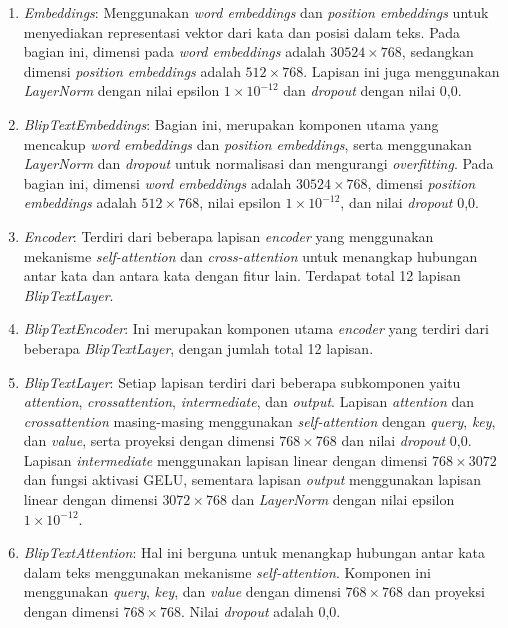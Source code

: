 \begin{enumerate}

  \item \textit{Embeddings}: Menggunakan \textit{word embeddings} dan \textit{position embeddings} untuk menyediakan representasi vektor dari kata dan posisi dalam teks. Pada bagian ini, dimensi pada \textit{word embeddings} adalah $30524 \times 768$, sedangkan dimensi \textit{position embeddings} adalah $512 \times 768$. Lapisan ini juga menggunakan \textit{LayerNorm} dengan nilai epsilon $1 \times 10^{-12}$ dan \textit{dropout} dengan nilai 0,0.

  \item \textit{BlipTextEmbeddings}: Bagian ini, merupakan komponen utama yang mencakup \textit{word embeddings} dan \textit{position embeddings}, serta menggunakan \textit{LayerNorm} dan \textit{dropout} untuk normalisasi dan mengurangi \textit{overfitting}. Pada bagian ini, dimensi \textit{word embeddings} adalah $30524 \times 768$, dimensi \textit{position embeddings} adalah $512 \times 768$, nilai epsilon $1 \times 10^{-12}$, dan nilai \textit{dropout} 0,0.

  \item \textit{Encoder}: Terdiri dari beberapa lapisan \textit{encoder} yang menggunakan mekanisme \textit{self-attention} dan \textit{cross-attention} untuk menangkap hubungan antar kata dan antara kata dengan fitur lain. Terdapat total 12 lapisan \textit{BlipTextLayer}.

  \item \textit{BlipTextEncoder}: Ini merupakan komponen utama \textit{encoder} yang terdiri dari beberapa \textit{BlipTextLayer}, dengan jumlah total 12 lapisan.

  \item \textit{BlipTextLayer}: Setiap lapisan terdiri dari beberapa subkomponen yaitu \textit{attention}, \textit{crossattention}, \textit{intermediate}, dan \textit{output}. Lapisan \textit{attention} dan \textit{crossattention} masing-masing menggunakan \textit{self-attention} dengan \textit{query}, \textit{key}, dan \textit{value}, serta proyeksi dengan dimensi $768 \times 768$ dan nilai \textit{dropout} 0,0. Lapisan \textit{intermediate} menggunakan lapisan linear dengan dimensi $768 \times 3072$ dan fungsi aktivasi GELU, sementara lapisan \textit{output} menggunakan lapisan linear dengan dimensi $3072 \times 768$ dan \textit{LayerNorm} dengan nilai epsilon $1 \times 10^{-12}$.

  \item \textit{BlipTextAttention}: Hal ini berguna untuk menangkap hubungan antar kata dalam teks menggunakan mekanisme \textit{self-attention}. Komponen ini menggunakan \textit{query}, \textit{key}, dan \textit{value} dengan dimensi $768 \times 768$ dan proyeksi dengan dimensi $768 \times 768$. Nilai \textit{dropout} adalah 0,0.


\end{enumerate}
